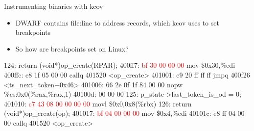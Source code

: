 \documentclass{beamer}
\begin{document}
\begin{frame}[fragile]{Instrumenting binaries with kcov}
  \begin{itemize}
    \item DWARF contains file:line to address records, which kcov uses to set breakpoints
    \item<3-> So how are breakpoints set on Linux?
  \end{itemize}
  \begin{Example}
    \begin{semiverbatim}
      \scriptsize
 124:     return (void*)op\_create(RPAR);
400ff7:       \textcolor<2>{red}{bf 30 00 00 00}          mov    \$0x30,\%edi
400ffc:       e8 1f 05 00 00          callq  401520 <op\_create>
401001:       e9 20 ff ff ff          jmpq   400f26 <ts\_next\_token+0x46>
401006:       66 2e 0f 1f 84 00 00    nopw   \%cs:0x0(\%rax,\%rax,1)
40100d:       00 00 00
 125: p\_state->last\_token\_is\_od = 0;
401010:       \textcolor<2>{red}{c7 43 08 00 00 00 00}    movl   \$0x0,0x8(\%rbx)
 126: return (void*)op\_create(op);
401017:       \textcolor<2>{red}{bf 04 00 00 00}          mov    \$0x4,\%edi
40101c:       e8 ff 04 00 00          callq  401520 <op\_create>
   \end{semiverbatim}
   \end{Example}
\end{frame}
\end{document}
